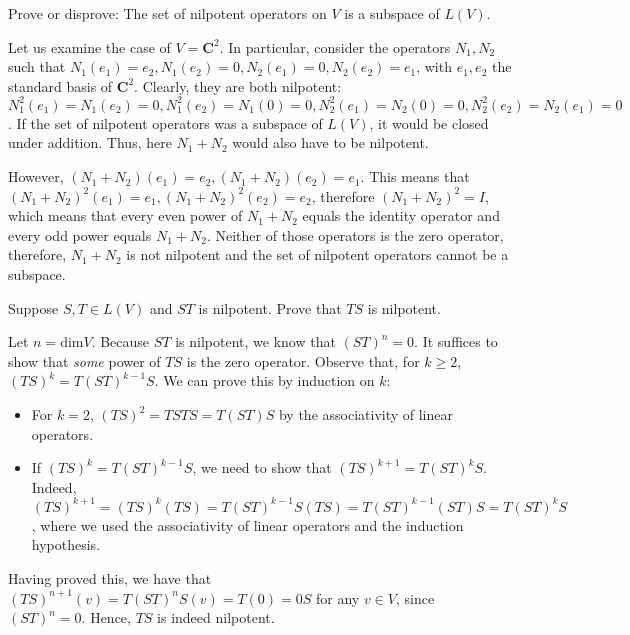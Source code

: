  \begin{exercise}{8}
     Prove or disprove: The set of nilpotent operators on $V$ is a subspace of $L(V)$.
 \end{exercise}

 \begin{solution}

     Let us examine the case of $V = \mathbf{C}^2$. In particular, consider the operators $N_1, N_2$ such that $N_1(e_1) = e_2, N_1(e_2) = 0, N_2(e_1) = 0, N_2(e_2) = e_1$, with $e_1, e_2$ the standard basis of $\mathbf{C}^2$. Clearly, they are both nilpotent: $N_1^2(e_1) = N_1(e_2) = 0, N_1^2(e_2) = N_1(0) = 0, N_2^2(e_1) = N_2(0) = 0, N_2^2(e_2) = N_2(e_1) = 0$. If the set of nilpotent operators was a subspace of $L(V)$, it would be closed under addition. Thus, here $N_1 + N_2$ would also have to be nilpotent.

     However, $(N_1 + N_2)(e_1) = e_2, (N_1 + N_2)(e_2) = e_1$. This means that $(N_1 + N_2)^2(e_1) = e_1, (N_1 + N_2)^2(e_2) = e_2$, therefore $(N_1 + N_2)^2 = I$, which means that every even power of $N_1 + N_2$ equals the identity operator and every odd power equals $N_1 + N_2$. Neither of those operators is the zero operator, therefore, $N_1+N_2$ is not nilpotent and the set of nilpotent operators cannot be a subspace.
 \end{solution}

 \begin{exercise}{9}
     Suppose $S, T \in L(V)$ and $ST$ is nilpotent. Prove that $TS$ is nilpotent.
 \end{exercise}

 \begin{solution}

     Let $n = \text{dim} V$. Because $ST$ is nilpotent, we know that $(ST)^n = 0$. It suffices to show that \textit{some} power of $TS$ is the zero operator. Observe that, for $k \geq 2$, $(TS)^k = T(ST)^{k-1}S$. We can prove this by induction on  $k$:
     \begin{itemize}
         \item For $k=2$, $(TS)^2 = TSTS = T(ST)S$ by the associativity of linear operators.
         \item If $(TS)^k = T(ST)^{k-1}S$, we need to show that $(TS)^{k+1} = T(ST)^{k}S$. Indeed, $(TS)^{k+1} = (TS)^k(TS) = T(ST)^{k-1}S(TS)= T(ST)^{k-1}(ST)S = T(ST)^{k}S$, where we used the associativity of linear operators and the induction hypothesis.
     \end{itemize}
     Having proved this, we have that $(TS)^{n+1}(v) = T(ST)^{n}S(v) = T(0) = 0S$ for any $v \in V$, since $(ST)^{n} = 0$. Hence, $TS$ is indeed nilpotent.
 \end{solution}


